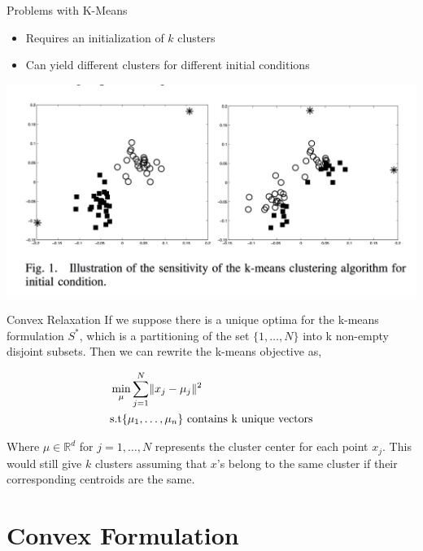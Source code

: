 \documentclass[12pt]{beamer}
\begin{document}
\begin{frame}{Problems with K-Means}
	\begin{itemize}
		\item Requires an initialization of $k$ clusters
		\item Can yield different clusters for different initial conditions 
	\end{itemize}
	\begin{center}
		\includegraphics[scale=0.3]{../figures/Kmeans_diffclusters.png}
	\end{center}	

\end{frame}

\begin{frame}{Convex Relaxation}
	If we suppose there is a unique optima for the k-means formulation $S^*$, which is a partitioning of the set $\{1,\dots,N\}$ into k non-empty disjoint subsets. Then we can rewrite the k-means objective as,
	
	$$
	\begin{aligned}
	&\min_\mu \sum_{j=1}^N \lVert x_j - \mu_j \rVert^2 \\
	&\text{s.t} \{\mu_1,\dots,\mu_n\} \space \text{ contains k unique vectors}
	\end{aligned}
	$$
	
	Where $\mu \in \mathbb{R}^d$ for $j=1,\dots,N$ represents the cluster center for each point $x_j$. This would still give $k$ clusters assuming that $x$'s belong to the same cluster if their corresponding centroids are the same.
\end{frame}

\section{Convex Formulation}
\end{document}
